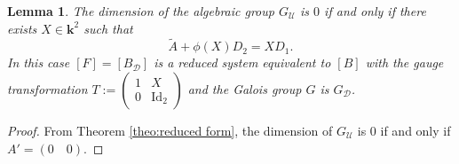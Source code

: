 \documentclass[a4paper,11pt]{amsart}
\newcommand{\Gdiag}{G_{\mathcal{D}}}
\newcommand{\Gunip}{G_{\mathcal{U}}}
\newtheorem{lem}[thm]{Lemma}
\def\k{\mathbf{k}}
\begin{document}
\begin{lem}
\label{lem:dimGu0}
The dimension of the algebraic group $\Gunip$ is $0$ if and only if there exists $X\in\k^2$ such that 
\begin{equation}
\label{eq:eqverif}
    \widetilde{A}+\phi(X)D_2=XD_1.
\end{equation}
In this case $[F]= [B_{\mathcal{D}}]$ is a reduced system equivalent to $[B]$ with the gauge transformation $T:=\begin{pmatrix}
1& X \\ 
0 & \mathrm{Id}_2
\end{pmatrix}$ and the Galois group $G$ is $\Gdiag$.
\end{lem}

\begin{proof}
From Theorem \ref{theo:reduced form}, the dimension of $\Gunip$ is $0$ if and only if $A' = (0\quad 0) $.
\end{proof}
\end{document}
